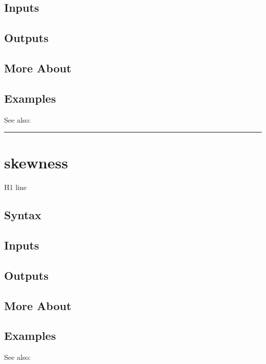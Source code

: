 \documentclass[letterpaper,10pt,english]{sphinxmanual}
\begin{document}
\subsection{Inputs}
\label{classes/time_series/@ts/ts:id513}

\subsection{Outputs}
\label{classes/time_series/@ts/ts:id514}

\subsection{More About}
\label{classes/time_series/@ts/ts:id515}

\subsection{Examples}
\label{classes/time_series/@ts/ts:id516}
See also:


\bigskip\hrule{}\bigskip



\section{skewness}
\label{classes/time_series/@ts/ts:id517}\label{classes/time_series/@ts/ts:skewness}
H1 line


\subsection{Syntax}
\label{classes/time_series/@ts/ts:id518}

\subsection{Inputs}
\label{classes/time_series/@ts/ts:id519}

\subsection{Outputs}
\label{classes/time_series/@ts/ts:id520}

\subsection{More About}
\label{classes/time_series/@ts/ts:id521}

\subsection{Examples}
\label{classes/time_series/@ts/ts:id522}
See also:
\end{document}
